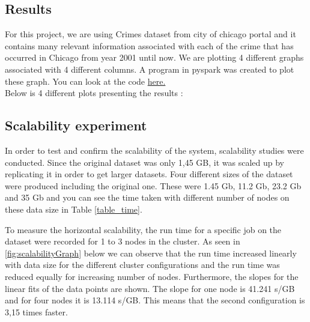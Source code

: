 \subsection{Results}
For this project, we are using Crimes dataset\cite{cityOfChicago} from city of chicago portal and it contains many relevant information associated with each of the crime that has occurred in Chicago from year 2001 until now. We are plotting 4 different graphs associated with 4 different columns. A program in pyspark was created to plot these graph. You can look at the code \href{https://github.com/ankurshukla03/ldsaproject/blob/edit_report/code/Crimes.ipynb}{here.} \\
Below is 4 different plots presenting the results :\\





\subsection{Scalability experiment}
In order to test and confirm the scalability of the system, scalability studies were conducted. Since the original dataset was only 1,45 GB, it was scaled up by replicating it in order to get larger datasets. Four different sizes of the dataset were produced including the original one. These were 1.45 Gb, 11.2 Gb, 23.2 Gb and 35 Gb and you can see the time taken with different number of nodes on these data size in Table \ref{table_time}.

To measure the horizontal scalability, the run time for a specific job on the dataset were recorded for 1 to 3 nodes in the cluster. As seen in  \ref{fig:scalabilityGraph} below we can observe that
the run time increased linearly with data size for the different cluster configurations and the run time was reduced equally for increasing number of nodes. Furthermore, the slopes for the linear fits of the data points are shown. The slope for one node is 41.241 s/GB and for four nodes it is 13.114 s/GB. This means that the second configuration is 3,15 times faster.\\

